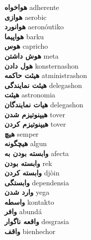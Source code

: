 \textbf{ هواخواه  } adherente \\
\textbf{ هوازی  } aerobic \\
\textbf{ هوانورد  } aeronóutiko \\
\textbf{ هواپیما  } barku \\
\textbf{ هوس  } capricho \\
\textbf{ هوش داشتن  } meta \\
\textbf{ هول دادن  } konsternashon \\
\textbf{ هیئت حاکمه  } atministrashon \\
\textbf{ هیئت نمایندگی  } delegashon \\
\textbf{ هیئت  } astronomia \\
\textbf{ هیات نمایندگان  } delegashon \\
\textbf{ هیپنوتیزم شدن  } tover \\
\textbf{ هیپنوتیزم کردن  } tover \\
\textbf{ هیچ  } semper \\
\textbf{ هیچگونه  } algun \\
\textbf{ وابسته بودن به  } afecta \\
\textbf{ وابسته بودن  } rek \\
\textbf{ وابسته کردن  } djòin \\
\textbf{ وابستگی  } dependensia \\
\textbf{ وارد شدن  } yega \\
\textbf{ واسطه  } kontakto \\
\textbf{ وافر  } abundá \\
\textbf{ واقعه ناگوار  } desgrasia \\
\textbf{ واقف  } bienhechor \\
